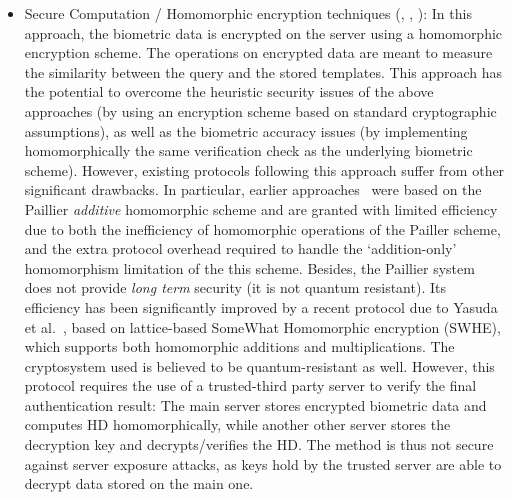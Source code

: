 \begin{itemize}
\item Secure Computation / Homomorphic encryption techniques
    (\cite{yasuda2014practical}, \cite{shahandashti2012private},
    \cite{higo2015privacy}): In this approach, the biometric data is encrypted
    on the server using a homomorphic encryption scheme. The operations on
    encrypted data are meant to measure the similarity between the query and the
    stored templates. This approach has the potential to overcome the heuristic
    security issues of the above approaches (by using an encryption scheme based
    on standard cryptographic assumptions), as well as the biometric accuracy
    issues (by implementing homomorphically the same verification check as the
    underlying biometric scheme). However, existing protocols following this
    approach suffer from other significant drawbacks. In particular, earlier
    approaches~\cite{shahandashti2012private} were based on the Paillier
    \emph{additive} homomorphic scheme and are granted with limited efficiency due to
    both the inefficiency of homomorphic operations of the Pailler scheme, and
    the extra protocol overhead required to handle the `addition-only'
    homomorphism limitation of the this scheme. Besides, the Paillier system
    does not provide \emph{long term} security (it is not quantum resistant).
    Its efficiency has been
    significantly improved by a recent protocol due to Yasuda et
    al.~\cite{yasuda2014practical}, based on lattice-based SomeWhat Homomorphic
    encryption (SWHE), which supports both homomorphic additions and multiplications.
    The cryptosystem used is believed to be quantum-resistant as
    well.
    However, this protocol requires the use of a trusted-third party server to
    verify the final authentication result: The main server stores encrypted
    biometric data and computes HD homomorphically, while another other server stores the
    decryption key and decrypts/verifies the HD.
    The method is thus not secure against
    server exposure attacks, as keys hold by the trusted server are able to decrypt data stored on the
    main one.
  \end{itemize}

